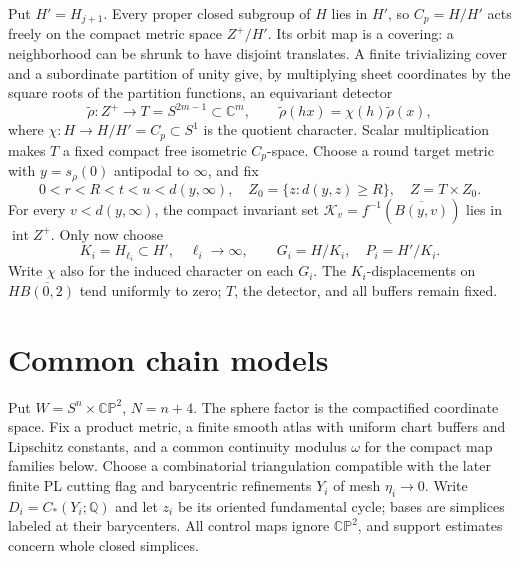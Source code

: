 \documentclass[11pt]{amsart}
\numberwithin{equation}{section}
\theoremstyle{definition}
\theoremstyle{remark}
\newcommand{\Q}{\mathbb Q}
\newcommand{\C}{\mathbb C}
\newcommand{\CP}{\mathbb {CP}}
\begin{document}
Put $H'=H_{j+1}$. Every proper closed subgroup of $H$ lies in $H'$, so
$C_p=H/H'$ acts freely on the compact metric space $Z^+/H'$. Its orbit
map is a covering: a neighborhood can be shrunk to have disjoint
translates. A finite trivializing cover and a subordinate partition
of unity give, by multiplying sheet coordinates by the square roots
of the partition functions, an equivariant detector
\begin{equation}\label{geo:detector}
 \widetilde\rho:Z^+\longrightarrow T=S^{2m-1}\subset\C^m,
 \qquad\widetilde\rho(hx)=\chi(h)\widetilde\rho(x),
\end{equation}
where $\chi:H\to H/H'=C_p\subset S^1$ is the quotient character.
Scalar multiplication makes $T$ a
fixed compact free isometric $C_p$-space.
Choose a round target metric with $y=s_\rho(0)$ antipodal to $\infty$,
and fix
\begin{equation}\label{geo:buffers}
 0<r<R<t<u<d(y,\infty),\quad
 Z_0=\{z:d(y,z)\ge R\},\quad Z=T\times Z_0.
\end{equation}
For every $v<d(y,\infty)$, the compact invariant set
$\mathcal K_v=f^{-1}(\overline{B(y,v)})$ lies in $\operatorname{int}Z^+$.
Only now choose
\begin{equation}\label{geo:finite-quotients}
 K_i=H_{\ell_i}\subset H',\quad\ell_i\to\infty,\qquad
 G_i=H/K_i,\quad P_i=H'/K_i.
\end{equation}
Write $\chi$ also for the induced character on each $G_i$.
The $K_i$-displacements on $H\overline{B(0,2)}$ tend uniformly to zero;
$T$, the detector, and all buffers remain fixed.

\section{Common chain models}\label{geo:chain-models}

Put $W=S^n\times\CP^2$, $N=n+4$. The sphere factor is the compactified
coordinate space. Fix a product metric, a finite smooth atlas with
uniform chart buffers and Lipschitz constants, and a common continuity
modulus $\omega$ for the compact map families below. Choose a
combinatorial triangulation compatible with the later finite PL cutting flag and
barycentric refinements $Y_i$ of mesh $\eta_i\to0$. Write
$D_i=C_*(Y_i;\Q)$ and let $z_i$ be its oriented fundamental cycle;
bases are simplices labeled at their barycenters. All control maps
ignore $\CP^2$, and support estimates concern whole closed simplices.
\end{document}
